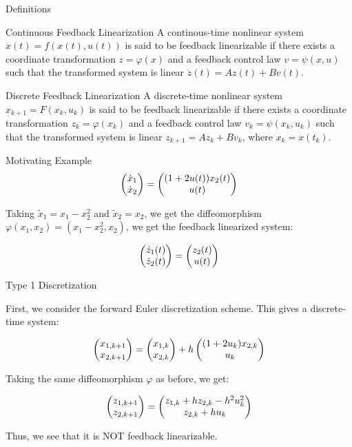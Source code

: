 \documentclass{beamer}
\begin{document}
\begin{frame}{Definitions}
\begin{block}{Continuous Feedback Linearization}
  A continous-time nonlinear system $\dot{x}(t) = f(x(t), u(t))$ is said to be feedback linearizable if there exists a coordinate transformation $z = \varphi(x)$ and a feedback control law $v = \psi(x,u)$ such that the transformed system is linear $\dot{z}(t) = Az(t) + Bv(t)$.
\end{block}

\begin{block}{Discrete Feedback Linearization}
  A discrete-time nonlinear system $x_{k+1} = F(x_k, u_k)$ is said to be feedback linearizable if there exists a coordinate transformation $z_k = \varphi(x_k)$ and a feedback control law $v_k = \psi(x_k,u_k)$ such that the transformed system is linear $ z_{k+1} = Az_k + Bv_k $, where $x_k = x(t_k)$.
\end{block}

\end{frame}

\begin{frame}{Motivating Example}
  \begin{equation}
    \begin{pmatrix}\dot{x}_1 \\ \dot{x}_2\end{pmatrix} = \begin{pmatrix}(1+2u(t))x_2(t) \\ u(t)\end{pmatrix}
\end{equation}

Taking $\tilde{x}_1 = x_1 - x_2^2$ and $\tilde{x}_2 = x_2$, we get the diffeomorphism $\varphi(x_1, x_2) = \left(x_1 - x_2^2, x_2 \right)$, we get the feedback linearized system:

\begin{equation}
\begin{pmatrix}\dot{z}_1(t) \\ \dot{z}_2(t)\end{pmatrix} = \begin{pmatrix}z_2(t) \\ u(t)\end{pmatrix}
\end{equation}
\end{frame}

\begin{frame}{Type 1 Discretization}

First, we consider the forward Euler discretization scheme. This gives a discrete-time system:

\begin{equation}
\begin{pmatrix}x_{1,k+1} \\ x_{2, k+1}\end{pmatrix} = \begin{pmatrix}x_{1,k} \\ x_{2,k}\end{pmatrix} + h\begin{pmatrix}(1+2u_k)x_{2,k} \\ u_k\end{pmatrix}
\end{equation}

Taking the same diffeomorphism $\varphi$ as before, we get:

\begin{equation}
\begin{pmatrix}z_{1,k+1} \\ z_{2,k+1}\end{pmatrix} = \begin{pmatrix}z_{1,k} + hz_{2,k} - h^2 u_k^2 \\ z_{2,k} + h u_k\end{pmatrix}
\end{equation}

Thus, we see that it is NOT feedback linearizable.

\end{frame}
\end{document}
